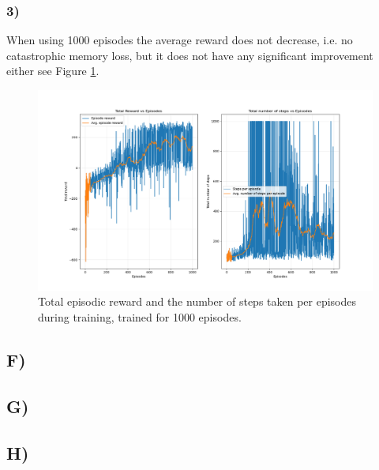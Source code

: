 \documentclass{article}
\begin{document}
\subsubsection*{3)}
When using 1000 episodes the average reward does not decrease, i.e. no catastrophic memory loss, but it does not have any significant improvement either see Figure \ref{fig:episodes1000}.
\begin{figure}[H]
    \centering
    \includegraphics[width=1\textwidth]{Lab_2/problem1/images/episodes1000.png}
    \caption{\small Total episodic reward and the number of steps taken per episodes during training, trained for 1000 episodes. }
    \label{fig:episodes1000}
\end{figure}

\subsection*{F)}

\subsection*{G)}

\subsection*{H)}
\end{document}
